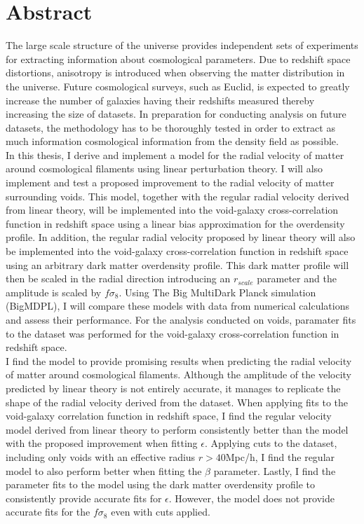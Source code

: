 \chapter*{Abstract}
The large scale structure of the universe provides independent sets of experiments for extracting information about cosmological parameters. Due to redshift space distortions, anisotropy is introduced when observing the matter distribution in the universe.
Future cosmological surveys, such as Euclid, is expected to greatly increase the number of galaxies having their redshifts measured thereby increasing the size of datasets. In preparation for conducting analysis on future datasets, the methodology has to be thoroughly tested in order to extract as much information cosmological information from the density field as possible.\\\indent
In this thesis, I derive and implement a model for the radial velocity of matter around cosmological filaments using linear perturbation theory. I will also implement and test a proposed improvement to the radial velocity of matter surrounding voids\cite{Achitouv_streaming}. This model, together with the regular radial velocity derived from linear theory, will be implemented into the void-galaxy cross-correlation function in redshift space using a linear bias approximation for the overdensity profile. In addition, the regular radial velocity proposed by linear theory will also be implemented into the void-galaxy cross-correlation function in redshift space using an arbitrary dark matter overdensity profile. This dark matter profile will then be scaled in the radial direction introducing an $r_{scale}$ parameter and the amplitude is scaled by $f\sigma_8$. Using The Big MultiDark Planck simulation (BigMDPL)\cite{Multidark_dataset}, I will compare these models with data from numerical calculations and assess their performance. For the analysis conducted on voids, paramater fits to the dataset was performed for the void-galaxy cross-correlation function in redshift space. 
\\\indent
I find the model to provide promising results when predicting the radial velocity of matter around cosmological filaments. Although the amplitude of the velocity predicted by linear theory is not entirely accurate, it manages to replicate the shape of the radial velocity derived from the dataset. When applying fits to the void-galaxy correlation function in redshift space, I find the regular velocity model derived from linear theory to perform consistently better than the model with the proposed improvement when fitting $\epsilon$. Applying cuts to the dataset, including only voids with an effective radius $r>40$Mpc/h, I find the regular model to also perform better when fitting the $\beta$ parameter. Lastly, I find the parameter fits to the model using the dark matter overdensity profile to consistently provide accurate fits for $\epsilon$. However, the model does not provide accurate fits for the $f\sigma_8$ even with cuts applied.
\\\indent